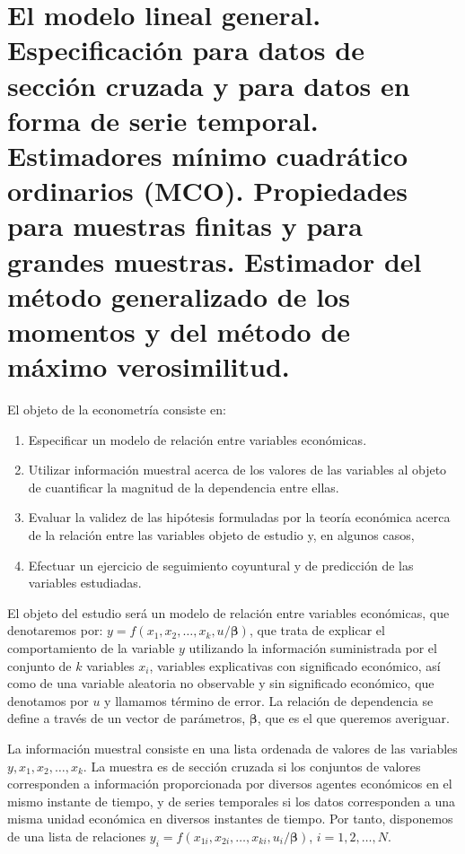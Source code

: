 \chapter[El modelo lineal general.]{El modelo lineal general. \\
\normalsize Especificaci\'on para datos de secci\'on cruzada y para datos en forma de serie temporal. Estimadores m\'inimo cuadr\'atico ordinarios (MCO). Propiedades para muestras finitas y para grandes muestras. Estimador del m\'etodo generalizado de los momentos y del m\'etodo de m\'aximo verosimilitud.}



El objeto de la econometr\'ia consiste en:
\begin{enumerate}
\item Especificar un modelo de relaci\'on entre variables econ\'omicas.
\item Utilizar informaci\'on muestral acerca de los valores de las variables
al objeto de cuantificar la magnitud de la dependencia entre ellas.
\item Evaluar la validez de las hip\'otesis formuladas por la teor\'ia econ\'omica
acerca de la relaci\'on entre las variables objeto de estudio y, en
algunos casos,
\item Efectuar un ejercicio de seguimiento coyuntural y de predicci\'on de
las variables estudiadas.
\end{enumerate}
El objeto del estudio ser\'a un modelo de relaci\'on entre variables econ\'omicas,
que denotaremos por: $y=f\left(x_{1},x_{2},\ldots,x_{k},u/\boldsymbol{\beta}\right)$,
que trata de explicar el comportamiento de la variable $y$ utilizando
la informaci\'on suministrada por el conjunto de $k$ variables $x_{i}$,
variables explicativas con significado econ\'omico, as\'i como de una
variable aleatoria no observable y sin significado econ\'omico, que
denotamos por $u$ y llamamos t\'ermino de error. La relaci\'on de dependencia
se define a trav\'es de un vector de par\'ametros, $\boldsymbol{\beta}$,
que es el que queremos averiguar.

La informaci\'on muestral consiste en una lista ordenada de valores
de las variables $y,x_{1},x_{2},\ldots,x_{k}$. La muestra es de secci\'on
cruzada si los conjuntos de valores corresponden a informaci\'on proporcionada
por diversos agentes econ\'omicos en el mismo instante de tiempo, y
de series temporales si los datos corresponden a una misma unidad
econ\'omica en diversos instantes de tiempo. Por tanto, disponemos de
una lista de relaciones $y_{i}=f\left(x_{1i},x_{2i},\ldots,x_{ki},u_{i}/\boldsymbol{\beta}\right)$,
$i=1,2,\ldots,N$.

